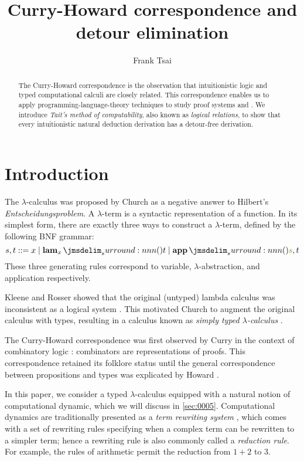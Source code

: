 \documentclass[a4paper]{article}
\title{Curry-Howard correspondence and detour elimination}
\author{Frank Tsai}
\begin{document}
 
\maketitle

\begin{abstract}
  The Curry-Howard correspondence is the observation that intuitionistic logic and typed computational calculi are closely related.
  This correspondence enables us to apply programming-language-theory techniques to study proof systems and \viceversa.
  We introduce \emph{Tait's method of computability}, also known as \emph{logical relations}, to show that every intuitionistic natural deduction derivation has a detour-free derivation.
\end{abstract}

\section{Introduction}
\label{sec:0000}

The $\lambda$-calculus was proposed by Church \cite{Church32,Church36} as a negative answer to Hilbert's \emph{Entscheidungsproblem}.
A $\lambda$-term is a syntactic representation of a function.
In its simplest form, there are exactly three ways to construct a $\lambda$-term, defined by the following BNF grammar:
\[
  s, t ::= x \mathrel{|} \tmLam{x}{t} \mathrel{|} \tmApp{s}{t}
\]
These three generating rules correspond to variable, $\lambda$-abstraction, and application respectively.

Kleene and Rosser showed that the original (untyped) lambda calculus was inconsistent as a logical system \cite{Kleene35}.
This motivated Church to augment the original calculus with types, resulting in a calculus known as \emph{simply typed $\lambda$-calculus} \cite{Church40}.

The Curry-Howard correspondence was first observed by Curry in the context of combinatory logic \cite{Curry58}: combinators are representations of proofs.
This correspondence retained its folklore status until the general correspondence between propositions and types was explicated by Howard \cite{Howard80}.

In this paper, we consider a typed $\lambda$-calculus equipped with a natural notion of computational dynamic, which we will discuss in \cref{sec:0005}.
Computational dynamics are traditionally presented as a \emph{term rewriting system} \cite{Klop92}, which comes with a set of rewriting rules specifying when a complex term can be rewritten to a simpler term; hence a rewriting rule is also commonly called a \emph{reduction rule}.
For example, the rules of arithmetic permit the reduction from $1 + 2$ to $3$.
\end{document}
